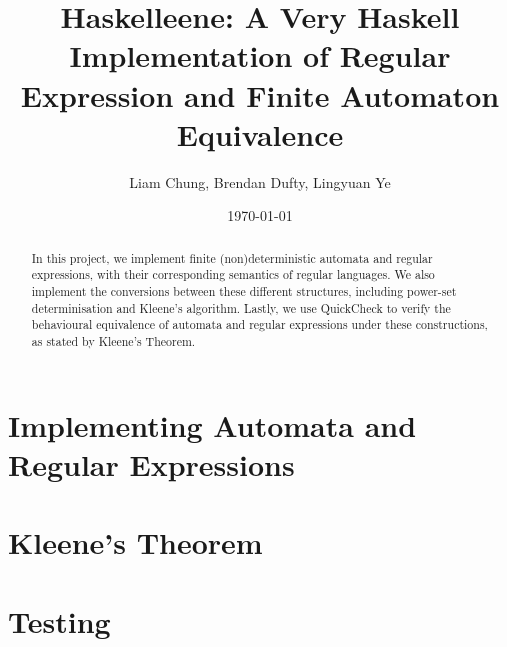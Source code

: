\documentclass[12pt]{article}
\title{Haskelleene: A Very Haskell Implementation of Regular Expression and
 Finite Automaton Equivalence}
\author{Liam Chung, Brendan Dufty, Lingyuan Ye}
\date{\today}
\begin{document}
\maketitle

\begin{abstract}
In this project, we implement finite (non)deterministic automata and regular expressions, with their corresponding semantics of regular languages. We also implement the conversions between these different structures, including power-set determinisation and Kleene's algorithm. Lastly, we use QuickCheck to verify the behavioural equivalence of automata and regular expressions under these constructions, as stated by Kleene's Theorem.
\end{abstract}

\vfill

\tableofcontents

\section{Implementing Automata and Regular Expressions}\label{sec:Defs}





\section{Kleene's Theorem}\label{sec:Kleene}


\section{Testing}\label{sec:Testing}






\end{document}

